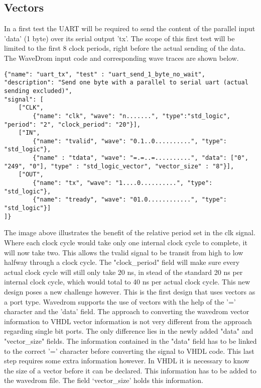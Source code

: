 \subsection{Vectors}
In a first test the UART will be required to send the content of the parallel input 'data' (1 byte) over its serial output 'tx'. The scope of this first test will be limited to the first 8 clock periods, right before the actual sending of the data. The WaveDrom input code and corresponding wave traces are shown below.
\begin{lstlisting}[style=json, caption={Source file for creating the first transmission test for the UART design in \ref{appendix:uart}}, label={json:uart_no_wait}]
{"name": "uart_tx", "test" : "uart_send_1_byte_no_wait", 
"description": "Send one byte with a parallel to serial uart (actual sending excluded)", 
"signal": [
	["CLK",
		{"name": "clk", "wave": "n.......", "type":"std_logic", "period": "2", "clock_period": "20"}],
	["IN",
		{"name": "tvalid", "wave": "0.1..0..........", "type": "std_logic"},
		{"name" : "tdata", "wave": "=.=..=..........", "data": ["0", "249", "0"], "type" : "std_logic_vector", "vector_size" : "8"}],
	["OUT",
		{"name": "tx", "wave": "1....0..........", "type": "std_logic"},
		{"name": "tready", "wave": "01.0............", "type": "std_logic"}]
]}
\end{lstlisting}\noindent
{}\newpage\noindent
The image above illustrates the benefit of the relative period set in the clk signal. Where each clock cycle would take only one internal clock cycle to complete, it will now take two. This allows the tvalid signal to be transit from high to low halfway through a clock cycle. The "clock\_period" field will make sure every actual clock cycle will still only take 20 ns, in stead of the standard 20 ns per internal clock cycle, which would total to 40 ns per actual clock cycle. 
\npar
This new design poses a new challenge however. This is the first design that uses vectors as a port type. Wavedrom supports the use of vectors with the help of the '=' character and the 'data' field. The approach to converting the wavedrom vector information to VHDL vector information is not very different from the approach regarding single bit ports. The only difference lies in the newly added "data" and "vector\_size" fields. The information contained in the "data" field has to be linked to the correct '=' character before converting the signal to VHDL code. This last step requires some extra information however. In VHDL it is necessary to know the size of a vector before it can be declared. This information has to be added to the wavedrom file. The field ‘vector\_size’ holds this information.
\newpage
